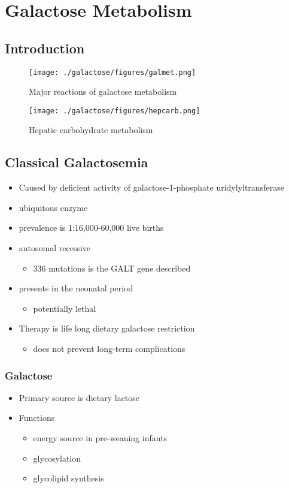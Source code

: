 \documentclass{scrartcl}
\begin{document}
\section{Galactose Metabolism}
\label{sec:orgf14ff46}
\subsection{Introduction}
\label{sec:orgaa63a98}
\begin{figure}[htbp]
\centering
\texttt{[image: ./galactose/figures/galmet.png]}
\caption{\label{fig:org4763021}
Major reactions of galactose metabolism}
\end{figure}


\begin{figure}[htbp]
\centering
\texttt{[image: ./galactose/figures/hepcarb.png]}
\caption{\label{fig:orgfcd2351}
Hepatic carbohydrate metabolism}
\end{figure}

\subsection{Classical Galactosemia}
\label{sec:orge29f3e9}
\begin{itemize}
\item Caused by deficient activity of galactose-1-phosphate uridylyltransferase
\item ubiquitous enzyme
\item prevalence is 1:16,000-60,000 live births
\item autosomal recessive
\begin{itemize}
\item 336 mutations is the GALT gene described
\end{itemize}

\item presents in the neonatal period
\begin{itemize}
\item potentially lethal
\end{itemize}

\item Therapy is life long dietary galactose restriction
\begin{itemize}
\item does not prevent long-term complications
\end{itemize}
\end{itemize}

\subsubsection{Galactose}
\label{sec:org768b30d}
\begin{itemize}
\item Primary source is dietary lactose
\item Functions
\begin{itemize}
\item energy source in pre-weaning infants
\item glycosylation
\item glycolipid synthesis
\end{itemize}
\end{itemize}
\end{document}
